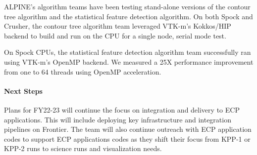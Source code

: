 ALPINE’s algorithm teams have been testing stand-alone versions of the contour tree algorithm and the statistical feature detection algorithm.  On both Spock and Crusher, the contour tree algorithm team leveraged VTK-m’s Kokkos/HIP backend to build and run on the CPU for a single node, serial mode test.  

On Spock CPUs, the statistical feature detection algorithm team successfully ran using VTK-m’s OpenMP backend.  We measured a 25X performance improvement from one to 64 threads using OpenMP acceleration.

\paragraph{Next Steps}

Plans for FY22-23 will continue the focus on integration and delivery to ECP applications.  This will include deploying key infrastructure and integration pipelines on Frontier. The team will also continue outreach with ECP application codes to support ECP applications codes as they shift their focus from  KPP-1 or KPP-2 runs to science runs and visualization needs.  

